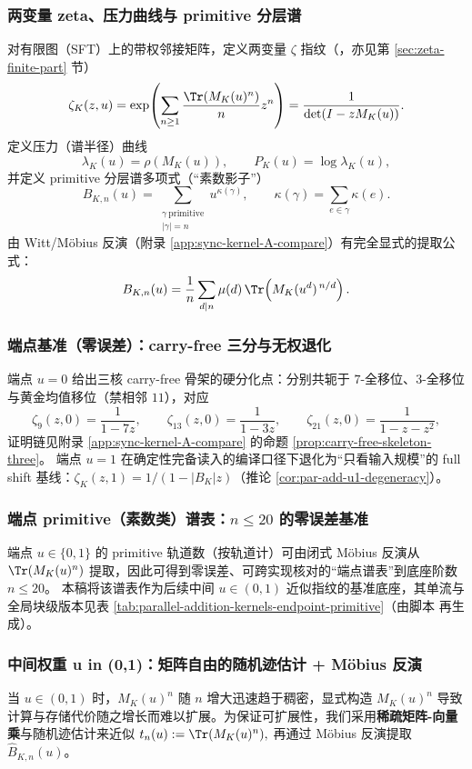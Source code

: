 \subsubsection{两变量 zeta、压力曲线与 primitive 分层谱}
对有限图（SFT）上的带权邻接矩阵，定义两变量 $\zeta$ 指纹（\cite{BrinStuck2002}，亦见第 \ref{sec:zeta-finite-part} 节）
\[
\zeta_K(z,u)
=\exp\!\left(\sum_{n\ge 1}\frac{\Tr(M_K(u)^n)}{n}z^n\right)
=\frac{1}{\det(I-zM_K(u))}.
\]
定义压力（谱半径）曲线
\[
\lambda_K(u)=\rho(M_K(u)),\qquad P_K(u)=\log\lambda_K(u),
\]
并定义 primitive 分层谱多项式（“素数影子”）
\[
B_{K,n}(u)=\sum_{\substack{\gamma\ \mathrm{primitive}\\|\gamma|=n}}u^{\kappa(\gamma)},
\qquad \kappa(\gamma)=\sum_{e\in\gamma}\kappa(e).
\]
由 Witt/Möbius 反演（附录 \ref{app:sync-kernel-A-compare}）有完全显式的提取公式：
\[
B_{K,n}(u)=\frac{1}{n}\sum_{d\mid n}\mu(d)\,\Tr\!\left(M_K(u^d)^{\,n/d}\right).
\]

\subsubsection{端点基准（零误差）：carry-free 三分与无权退化}
端点 $u=0$ 给出三核 carry-free 骨架的硬分化点：分别共轭于 $7$-全移位、$3$-全移位与黄金均值移位（禁相邻 $11$），对应
\[
\zeta_9(z,0)=\frac{1}{1-7z},\qquad
\zeta_{13}(z,0)=\frac{1}{1-3z},\qquad
\zeta_{21}(z,0)=\frac{1}{1-z-z^2},
\]
证明链见附录 \ref{app:sync-kernel-A-compare} 的命题 \ref{prop:carry-free-skeleton-three}。
端点 $u=1$ 在确定性完备读入的编译口径下退化为“只看输入规模”的 full shift 基线：$\zeta_K(z,1)=1/(1-|B_K|z)$（推论 \ref{cor:par-add-u1-degeneracy}）。

\subsubsection{端点 primitive（素数类）谱表：\texorpdfstring{$n\le 20$}{n<=20} 的零误差基准}
端点 $u\in\{0,1\}$ 的 primitive 轨道数（按轨道计）可由闭式 Möbius 反演从 $\Tr(M_K(u)^n)$ 提取，因此可得到零误差、可跨实现核对的“端点谱表”到底座阶数 $n\le 20$。
本稿将该谱表作为后续中间 $u\in(0,1)$ 近似指纹的基准底座，其单流与全局块级版本见表 \ref{tab:parallel-addition-kernels-endpoint-primitive}（由脚本  再生成）。

\subsubsection{中间权重 u in (0,1)：矩阵自由的随机迹估计 + Möbius 反演}
当 $u\in(0,1)$ 时，$M_K(u)^n$ 随 $n$ 增大迅速趋于稠密，显式构造 $M_K(u)^n$ 导致计算与存储代价随之增长而难以扩展。为保证可扩展性，我们采用\textbf{稀疏矩阵-向量乘}与随机迹估计来近似
\(
t_n(u):=\Tr(M_K(u)^n),
\)
再通过 Möbius 反演提取 $\widehat B_{K,n}(u)$。

